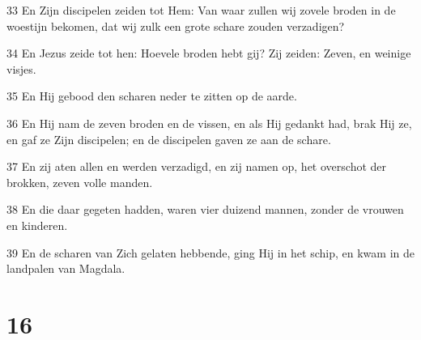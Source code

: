 \par 33 En Zijn discipelen zeiden tot Hem: Van waar zullen wij zovele broden in de woestijn bekomen, dat wij zulk een grote schare zouden verzadigen?
\par 34 En Jezus zeide tot hen: Hoevele broden hebt gij? Zij zeiden: Zeven, en weinige visjes.
\par 35 En Hij gebood den scharen neder te zitten op de aarde.
\par 36 En Hij nam de zeven broden en de vissen, en als Hij gedankt had, brak Hij ze, en gaf ze Zijn discipelen; en de discipelen gaven ze aan de schare.
\par 37 En zij aten allen en werden verzadigd, en zij namen op, het overschot der brokken, zeven volle manden.
\par 38 En die daar gegeten hadden, waren vier duizend mannen, zonder de vrouwen en kinderen.
\par 39 En de scharen van Zich gelaten hebbende, ging Hij in het schip, en kwam in de landpalen van Magdala.

\chapter{16}

